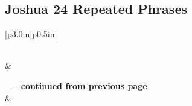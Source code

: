 \subsection{Joshua 24 Repeated Phrases}


\normalsize
 
\begin{center}
\begin{longtable}{|p{3.0in}|p{0.5in}|}
\caption[Joshua 24 Repeated Phrases]{Joshua 24 Repeated Phrases}\label{table:Repeated Phrases Joshua 24} \\
\hline {} &  \\ \hline 
\endfirsthead
 
{{\bfseries \tablename\ \thetable{} -- continued from previous page}} \\  
\hline {} &  \\ \hline 
\endhead
 

\end{longtable}
\end{center}
